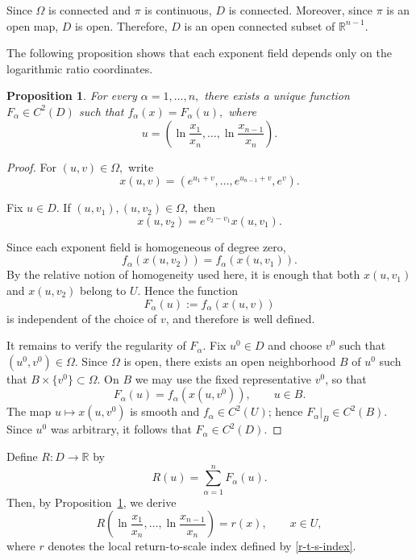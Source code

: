\documentclass[12pt]{amsart}
\newtheorem{proposition}{Proposition}[section]
\begin{document}
Since \(\Omega\) is connected and \(\pi\) is continuous,
\(D\) is connected. Moreover, since \(\pi\) is an open map,
\(D\) is open. Therefore,
\(D\) is an open connected subset of
\(\mathbb R^{n-1}\).

The following proposition shows that each exponent field depends only on
the logarithmic ratio coordinates.

\begin{proposition}\label{prop:F}
For every
\(
\alpha=1,\ldots,n,
\)
there exists a unique function
\(
F_\alpha\in C^2(D)
\)
such that
\(
f_\alpha(x)
=
F_\alpha(u),
\)
where
\[
u
=
\left(
\ln\frac{x_1}{x_n},
\ldots,
\ln\frac{x_{n-1}}{x_n}
\right).
\]
\end{proposition}

\begin{proof}

For
\(
(u,v)\in\Omega,
\)
write
\[
x(u,v)
=
\left(
e^{u_1+v},
\ldots,
e^{u_{n-1}+v},
e^v
\right).
\]

Fix
\(
u\in D.
\)
If
\(
(u,v_1),(u,v_2)\in\Omega,
\)
then
\[
x(u,v_2)
=
e^{\,v_2-v_1}x(u,v_1).
\]

Since each exponent field is homogeneous of degree zero,
\[
f_\alpha(x(u,v_2))
=
f_\alpha(x(u,v_1)).
\]
By the relative notion of homogeneity used here, it is enough that both
$x(u,v_1)$ and $x(u,v_2)$ belong to $U$.
Hence the function
\[
F_\alpha(u):=f_\alpha(x(u,v))
\]
is independent of the choice of $v$, and therefore is well defined.

It remains to verify the regularity of $F_\alpha$. Fix $u^0\in D$ and
choose $v^0$ such that $(u^0,v^0)\in\Omega$. Since $\Omega$ is open,
there exists an open neighborhood $B$ of $u^0$ such that
\(
B\times\{v^0\}\subset\Omega.
\)
On $B$ we may use the fixed representative $v^0$, so that
\[
F_\alpha(u)=f_\alpha(x(u,v^0)),\qquad u\in B.
\]
The map $u\mapsto x(u,v^0)$ is smooth and $f_\alpha\in C^2(U)$;
hence $F_\alpha|_B\in C^2(B)$. Since $u^0$ was arbitrary,
it follows that $F_\alpha\in C^2(D)$.

\end{proof}

Define
\(
R:D\longrightarrow\mathbb R
\)
by
\begin{equation}\label{functionR}
R(u)
=
\sum_{\alpha=1}^{n}
F_\alpha(u).
\end{equation}
Then,
by Proposition~\ref{prop:F}, we derive
\begin{equation}\label{return-index-log}
R
\left(
\ln\frac{x_1}{x_n},
\ldots,
\ln\frac{x_{n-1}}{x_n}
\right)
=
r(x),
\qquad
x\in U,
\end{equation}
where \(r\) denotes the local return-to-scale index defined by
\eqref{r-t-s-index}.
\end{document}
